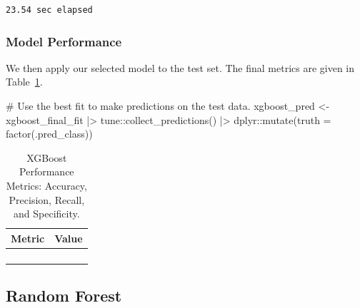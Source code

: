 \documentclass[
  letterpaper,
  DIV=11,
  numbers=noendperiod]{scrartcl}
\newenvironment{Shaded}{\begin{snugshade}}{\end{snugshade}}
\newcommand{\AttributeTok}[1]{\textcolor[rgb]{0.40,0.45,0.13}{#1}}
\newcommand{\CommentTok}[1]{\textcolor[rgb]{0.37,0.37,0.37}{#1}}
\newcommand{\FunctionTok}[1]{\textcolor[rgb]{0.28,0.35,0.67}{#1}}
\newcommand{\NormalTok}[1]{\textcolor[rgb]{0.00,0.23,0.31}{#1}}
\newcommand{\OtherTok}[1]{\textcolor[rgb]{0.00,0.23,0.31}{#1}}
\newcommand{\SpecialCharTok}[1]{\textcolor[rgb]{0.37,0.37,0.37}{#1}}
\begin{document}
\begin{verbatim}
23.54 sec elapsed
\end{verbatim}

\subsubsection{Model Performance}\label{model-performance-4}

We then apply our selected model to the test set. The final metrics are
given in Table~\ref{tbl-xgboost-performance-pdf}.

\begin{Shaded}
\begin{Highlighting}[]
\CommentTok{\# Use the best fit to make predictions on the test data.}
\NormalTok{xgboost\_pred }\OtherTok{\textless{}{-}} 
\NormalTok{  xgboost\_final\_fit }\SpecialCharTok{|\textgreater{}} 
\NormalTok{  tune}\SpecialCharTok{::}\FunctionTok{collect\_predictions}\NormalTok{() }\SpecialCharTok{|\textgreater{}}
\NormalTok{  dplyr}\SpecialCharTok{::}\FunctionTok{mutate}\NormalTok{(}\AttributeTok{truth =} \FunctionTok{factor}\NormalTok{(.pred\_class))}
\end{Highlighting}
\end{Shaded}

\begin{longtable}{>{\raggedright\arraybackslash}p{}>{\raggedleft\arraybackslash}p{}}

\caption{\label{tbl-xgboost-performance-pdf}XGBoost Performance Metrics:
Accuracy, Precision, Recall, and Specificity.}

\tabularnewline

\toprule
Metric & Value \\ 
\midrule\addlinespace[2.5pt]
\cellcolor[HTML]{FFFFFF}{Accuracy} & \cellcolor[HTML]{FFFFFF}{91.2} \\ 
\cellcolor[HTML]{FFFFFF}{Precision} & \cellcolor[HTML]{FFFFFF}{73.1} \\ 
\cellcolor[HTML]{FFFFFF}{Recall} & \cellcolor[HTML]{FFFFFF}{95.0} \\ 
\cellcolor[HTML]{FFFFFF}{Specificity} & \cellcolor[HTML]{FFFFFF}{90.1} \\ 
\bottomrule

\end{longtable}

\subsection{Random Forest}\label{random-forest}
\end{document}
